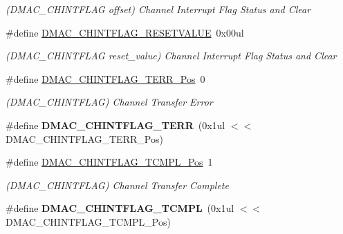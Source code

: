 \begin{DoxyCompactItemize}
\begin{DoxyCompactList}\small\item\em (D\+M\+A\+C\+\_\+\+C\+H\+I\+N\+T\+F\+L\+A\+G offset) Channel Interrupt Flag Status and Clear \end{DoxyCompactList}\item 
\hypertarget{group___s_a_m_l21___d_m_a_c_ga97ae1c21a5e11bf0b4a4fb681054909d}{}\#define \hyperlink{group___s_a_m_l21___d_m_a_c_ga97ae1c21a5e11bf0b4a4fb681054909d}{D\+M\+A\+C\+\_\+\+C\+H\+I\+N\+T\+F\+L\+A\+G\+\_\+\+R\+E\+S\+E\+T\+V\+A\+L\+U\+E}~0x00ul\label{group___s_a_m_l21___d_m_a_c_ga97ae1c21a5e11bf0b4a4fb681054909d}

\begin{DoxyCompactList}\small\item\em (D\+M\+A\+C\+\_\+\+C\+H\+I\+N\+T\+F\+L\+A\+G reset\+\_\+value) Channel Interrupt Flag Status and Clear \end{DoxyCompactList}\item 
\hypertarget{group___s_a_m_l21___d_m_a_c_ga5e720f036a844fb378db12da1e85f658}{}\#define \hyperlink{group___s_a_m_l21___d_m_a_c_ga5e720f036a844fb378db12da1e85f658}{D\+M\+A\+C\+\_\+\+C\+H\+I\+N\+T\+F\+L\+A\+G\+\_\+\+T\+E\+R\+R\+\_\+\+Pos}~0\label{group___s_a_m_l21___d_m_a_c_ga5e720f036a844fb378db12da1e85f658}

\begin{DoxyCompactList}\small\item\em (D\+M\+A\+C\+\_\+\+C\+H\+I\+N\+T\+F\+L\+A\+G) Channel Transfer Error \end{DoxyCompactList}\item 
\hypertarget{group___s_a_m_l21___d_m_a_c_ga331cdfbec4f163e24ceae030631ec87b}{}\#define {\bfseries D\+M\+A\+C\+\_\+\+C\+H\+I\+N\+T\+F\+L\+A\+G\+\_\+\+T\+E\+R\+R}~(0x1ul $<$$<$ D\+M\+A\+C\+\_\+\+C\+H\+I\+N\+T\+F\+L\+A\+G\+\_\+\+T\+E\+R\+R\+\_\+\+Pos)\label{group___s_a_m_l21___d_m_a_c_ga331cdfbec4f163e24ceae030631ec87b}

\item 
\hypertarget{group___s_a_m_l21___d_m_a_c_gaa5cff060abf458e84ad9df6aae3321cb}{}\#define \hyperlink{group___s_a_m_l21___d_m_a_c_gaa5cff060abf458e84ad9df6aae3321cb}{D\+M\+A\+C\+\_\+\+C\+H\+I\+N\+T\+F\+L\+A\+G\+\_\+\+T\+C\+M\+P\+L\+\_\+\+Pos}~1\label{group___s_a_m_l21___d_m_a_c_gaa5cff060abf458e84ad9df6aae3321cb}

\begin{DoxyCompactList}\small\item\em (D\+M\+A\+C\+\_\+\+C\+H\+I\+N\+T\+F\+L\+A\+G) Channel Transfer Complete \end{DoxyCompactList}\item 
\hypertarget{group___s_a_m_l21___d_m_a_c_ga5aa6c257ce581f7cdecdb31e15ab62a4}{}\#define {\bfseries D\+M\+A\+C\+\_\+\+C\+H\+I\+N\+T\+F\+L\+A\+G\+\_\+\+T\+C\+M\+P\+L}~(0x1ul $<$$<$ D\+M\+A\+C\+\_\+\+C\+H\+I\+N\+T\+F\+L\+A\+G\+\_\+\+T\+C\+M\+P\+L\+\_\+\+Pos)\label{group___s_a_m_l21___d_m_a_c_ga5aa6c257ce581f7cdecdb31e15ab62a4}


\end{DoxyCompactItemize}
